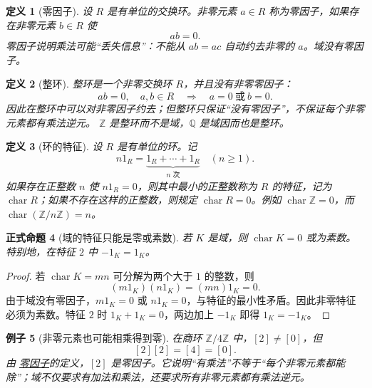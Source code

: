\documentclass[UTF8,fontset=none,a4paper,11pt]{ctexart}
\theoremstyle{foundation-definition}
\newtheorem{definition}{定义}[section]
\theoremstyle{foundation-theorem}
\theoremstyle{foundation-proposition}
\newtheorem{proposition}[definition]{正式命题}
\theoremstyle{foundation-example}
\newtheorem{example}[definition]{例子}
\theoremstyle{foundation-remark}
\theoremstyle{foundation-theorem}
\newcommand{\term}[2]{\hyperref[#1]{#2}}
\begin{document}
\begin{definition}[零因子]\label{def:zero-divisor}
设 \(R\) 是有单位的交换环。非零元素 \(a\in R\) 称为零因子，如果存在非零元素
\(b\in R\) 使
\[
ab=0.
\]
零因子说明乘法可能“丢失信息”：不能从 \(ab=ac\) 自动约去非零的 \(a\)。域没有零因子。
\end{definition}

\begin{definition}[整环]\label{def:integral-domain}
整环是一个非零交换环 \(R\)，并且没有非零零因子：
\[
  ab=0,\quad a,b\in R
  \quad\Longrightarrow\quad
  a=0\ \text{或}\ b=0.
\]
因此在整环中可以对非零因子约去；但整环只保证“没有零因子”，不保证每个非零元素都有乘法逆元。
\(\mathbb Z\) 是整环而不是域，\(\mathbb Q\) 是域因而也是整环。
\end{definition}

\begin{definition}[环的特征]\label{def:ring-characteristic}
设 \(R\) 是有单位的环。记
\[
n1_R=\underbrace{1_R+\cdots+1_R}_{n\text{ 次}}
\quad(n\ge1).
\]
如果存在正整数 \(n\) 使 \(n1_R=0\)，则其中最小的正整数称为
\(R\) 的特征，记为 \(\operatorname{char}R\)；如果不存在这样的正整数，则规定
\(\operatorname{char}R=0\)。例如 \(\operatorname{char}\mathbb Z=0\)，而
\(\operatorname{char}(\mathbb Z/n\mathbb Z)=n\)。
\end{definition}

\begin{proposition}[域的特征只能是零或素数]\label{prop:field-characteristic}
若 \(K\) 是域，则 \(\operatorname{char}K=0\) 或为素数。特别地，在特征 \(2\) 中
\(-1_K=1_K\)。
\end{proposition}

\begin{proof}
若 \(\operatorname{char}K=mn\) 可分解为两个大于 \(1\) 的整数，则
\[
(m1_K)(n1_K)=(mn)1_K=0.
\]
由于域没有零因子，\(m1_K=0\) 或 \(n1_K=0\)，与特征的最小性矛盾。因此非零特征必须为素数。特征 \(2\) 时
\(1_K+1_K=0\)，两边加上 \(-1_K\) 即得 \(1_K=-1_K\)。
\end{proof}

\begin{example}[非零元素也可能相乘得到零]
在商环 \(\mathbb Z/4\mathbb Z\) 中，\([2]\neq[0]\)，但
\[
[2][2]=[4]=[0].
\]
由 \term{def:zero-divisor}{零因子}的定义，\([2]\) 是零因子。它说明“有乘法”不等于“每个非零元素都能除”；域不仅要求有加法和乘法，还要求所有非零元素都有乘法逆元。
\end{example}
\end{document}
